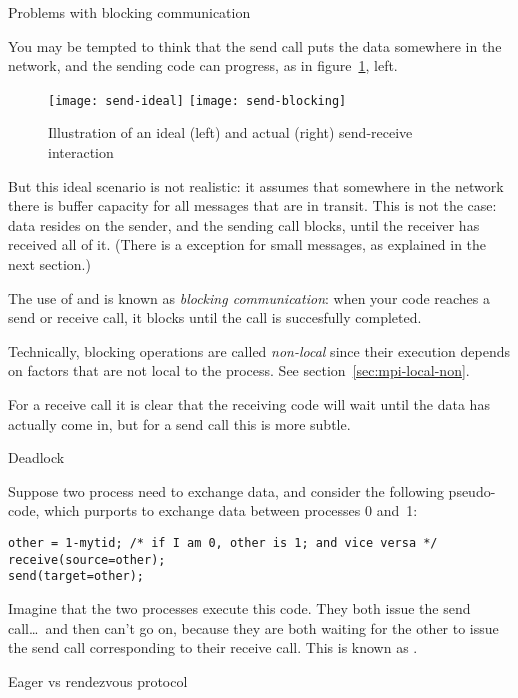  {Problems with blocking communication}
\label{sec:blocking}

You may be tempted to think that the send call puts the data somewhere
in the network, and the sending code can progress,
as in figure~\ref{fig:send-ideal}, left.
%
\begin{figure}[ht]
\leavevmode
\texttt{[image: send-ideal]}
\texttt{[image: send-blocking]}
\caption{Illustration of an ideal (left) and actual (right) send-receive interaction}
\label{fig:send-ideal}
\end{figure}
%
But this ideal scenario is not realistic: it assumes that somewhere
in the network there is buffer capacity for all messages that are in
transit.
This is not the case: data resides on the sender, and the sending call blocks,
until the receiver has received all of it. (There is a exception for
small messages, as explained in the next section.)

The use of  and 
is known as \emph{blocking communication}: when your code reaches a
send or receive call, it blocks until the call is succesfully completed.

Technically, blocking operations are called
\emph{non-local} since their execution
depends on factors that are not local to the process.
See section~\ref{sec:mpi-local-non}.

For a receive call it is clear that the receiving code will wait until
the data has actually come in, but for a send call this is more subtle.

 {Deadlock}

Suppose two process need to exchange data, and consider the following
pseudo-code, which purports to exchange data between processes 0 and~1:
\begin{lstlisting}
other = 1-mytid; /* if I am 0, other is 1; and vice versa */
receive(source=other);
send(target=other);
\end{lstlisting}
Imagine that the two processes execute this code. They both issue the
send call\ldots\ and then can't go on, because they are both waiting
for the other to issue the send call corresponding to their receive call.
This is known as .

 {Eager vs rendezvous protocol}
\label{sec:eager-limit}

